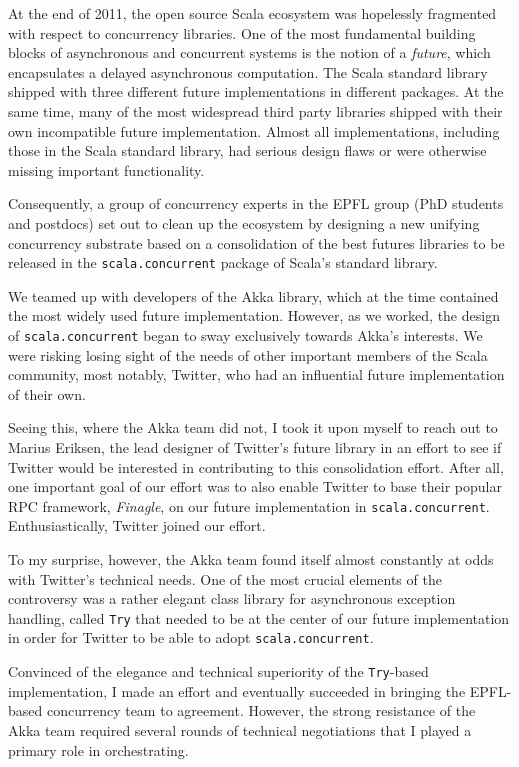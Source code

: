 \documentclass[acmtocl]{acmtrans2m}
\begin{document}
At the end of 2011, the open source Scala ecosystem was hopelessly fragmented
with respect to concurrency libraries. One of the most fundamental building
blocks of asynchronous and concurrent systems is the notion of a
\textit{future}, which encapsulates a delayed asynchronous computation. The
Scala standard library shipped with three different future implementations in
different packages. At the same time, many of the most widespread third party
libraries shipped with their own incompatible future implementation. Almost
all implementations, including those in the Scala standard library, had
serious design flaws or were otherwise missing important functionality.

Consequently, a group of concurrency experts in the EPFL group (PhD students
and postdocs) set out to clean up the ecosystem by designing a new unifying
concurrency substrate based on a consolidation of the best futures libraries
to be released in the \verb|scala.concurrent| package of Scala's standard
library.

We teamed up with developers of the Akka library, which at the time
contained the most widely used future implementation. However, as we worked,
the design of \verb|scala.concurrent| began to sway exclusively towards Akka's
interests. We were risking losing sight of the needs of other important
members of the Scala community, most notably, Twitter, who had an influential
future implementation of their own.

Seeing this, where the Akka team did not, I took it upon myself to reach out
to Marius Eriksen, the lead designer of Twitter's future library in an effort
to see if Twitter would be interested in contributing to this consolidation
effort. After all, one important goal of our effort was to also enable Twitter
to base their popular RPC framework, \textit{Finagle}, on our future
implementation in \verb|scala.concurrent|. Enthusiastically, Twitter joined
our effort.

To my surprise, however, the Akka team found itself almost constantly at odds
with Twitter's technical needs. One of the most crucial elements of the
controversy was a rather elegant class library for asynchronous exception
handling, called \verb|Try| that needed to be at the center of our future
implementation in order for Twitter to be able to adopt
\verb|scala.concurrent|.

Convinced of the elegance and technical superiority of the \verb|Try|-based
implementation, I made an effort and eventually succeeded in bringing the
EPFL-based concurrency team to agreement. However, the strong resistance of
the Akka team required several rounds of technical negotiations that I played
a primary role in orchestrating.
\end{document}
